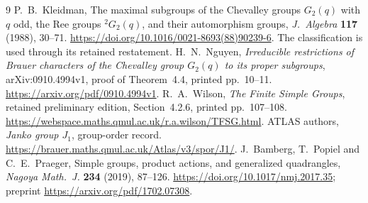 \documentclass[11pt]{article}
\begin{document}
\begin{thebibliography}{9}
P.~B.~Kleidman, The maximal subgroups of the Chevalley groups $G_2(q)$
with $q$ odd, the Ree groups \( {}^2G_2(q)\), and their automorphism groups,
\emph{J.~Algebra} \textbf{117} (1988), 30--71.
\url{https://doi.org/10.1016/0021-8693(88)90239-6}.
The classification is used through its retained restatement.
H.~N.~Nguyen, \emph{Irreducible restrictions of Brauer characters of the
Chevalley group $G_2(q)$ to its proper subgroups},
arXiv:0910.4994v1, proof of Theorem~4.4, printed pp.~10--11.
\url{https://arxiv.org/pdf/0910.4994v1}.
R.~A.~Wilson, \emph{The Finite Simple Groups},
retained preliminary edition, Section~4.2.6, printed pp.~107--108.
\url{https://webspace.maths.qmul.ac.uk/r.a.wilson/TFSG.html}.
ATLAS authors, \emph{Janko group $J_1$}, group-order record.
\url{https://brauer.maths.qmul.ac.uk/Atlas/v3/spor/J1/}.
J.~Bamberg, T.~Popiel and C.~E.~Praeger,
Simple groups, product actions, and generalized quadrangles,
\emph{Nagoya Math.~J.} \textbf{234} (2019), 87--126.
\url{https://doi.org/10.1017/nmj.2017.35};
preprint \url{https://arxiv.org/pdf/1702.07308}.
\end{thebibliography}
\end{document}
